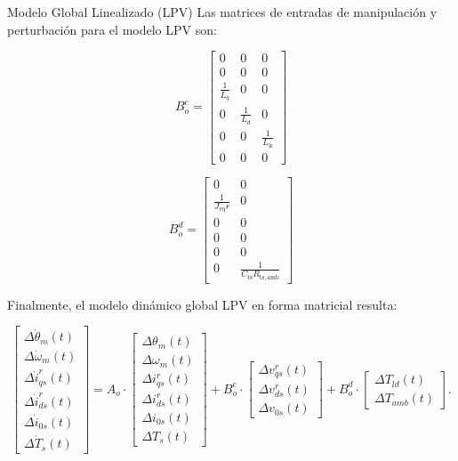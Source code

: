 \documentclass[12pt]{beamer}
\begin{document}
\begin{frame}{Modelo Global Linealizado (LPV)}\scriptsize
Las matrices de entradas de manipulación y perturbación para el modelo LPV son:

\begin{center}
\begin{minipage}{0.45\textwidth}
\[
B_o^c = 
\begin{bmatrix}
0 & 0 & 0 \\
0 & 0 & 0 \\
\frac{1}{L_q} & 0 & 0 \\
0 & \frac{1}{L_d} & 0 \\
0 & 0 & \frac{1}{L_{\mathrm{ls}}} \\
0 & 0 & 0
\end{bmatrix}
\]
\end{minipage}
\hfill
\begin{minipage}{0.45\textwidth}
\[
B_o^d = 
\begin{bmatrix}
0 & 0 \\
\frac{1}{J_{\mathrm{eq}} r} & 0 \\
0 & 0 \\
0 & 0 \\
0 & 0 \\
0 & \frac{1}{C_{\mathrm{ts}} R_{\mathrm{ts},\mathrm{amb}}}
\end{bmatrix}
\]
\end{minipage}
\end{center}

Finalmente, el modelo dinámico global LPV en forma matricial resulta:

\begin{equation}
\begin{bmatrix}
\Delta \dot{\theta}_m(t) \\
\Delta \dot{\omega}_m(t) \\
\Delta \dot{i}_{qs}^r(t) \\
\Delta \dot{i}_{ds}^r(t) \\
\Delta \dot{i}_{0s}(t) \\
\Delta \dot{T}_s(t)
\end{bmatrix}
=
A_o \cdot
\begin{bmatrix}
\Delta \theta_m(t) \\
\Delta \omega_m(t) \\
\Delta i_{qs}^r(t) \\
\Delta i_{ds}^r(t) \\
\Delta i_{0s}(t) \\
\Delta T_s(t)
\end{bmatrix}
+
B_o^c \cdot
\begin{bmatrix}
\Delta v_{qs}^r(t) \\
\Delta v_{ds}^r(t) \\
\Delta v_{0s}(t)
\end{bmatrix}
+
B_o^d \cdot
\begin{bmatrix}
\Delta T_{ld}(t) \\
\Delta T_{amb}(t)
\end{bmatrix}.
\end{equation}
\end{frame}
\end{document}
